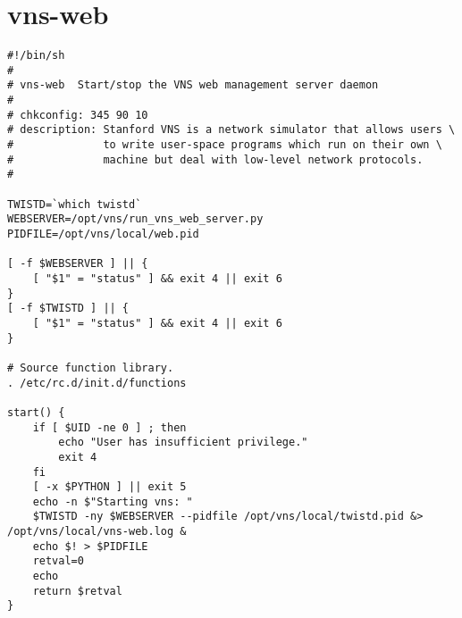 \documentclass[a4paper,12pt]{report}
\begin{document}
\section{vns-web}
\tiny
\begin{verbatim}
#!/bin/sh                                                                                                                                                                                     
#                                                                                                                                                                                             
# vns-web  Start/stop the VNS web management server daemon                                                                                                                                    
#                                                                                                                                                                                             
# chkconfig: 345 90 10                                                                                                                                                                        
# description: Stanford VNS is a network simulator that allows users \                                                                                                                        
#              to write user-space programs which run on their own \                                                                                                                          
#              machine but deal with low-level network protocols.                                                                                                                             
#                                                                                                                                                                                             

TWISTD=`which twistd`
WEBSERVER=/opt/vns/run_vns_web_server.py
PIDFILE=/opt/vns/local/web.pid

[ -f $WEBSERVER ] || {
    [ "$1" = "status" ] && exit 4 || exit 6
}
[ -f $TWISTD ] || {
    [ "$1" = "status" ] && exit 4 || exit 6
}

# Source function library.                                                                                                                                                                    
. /etc/rc.d/init.d/functions

start() {
    if [ $UID -ne 0 ] ; then
        echo "User has insufficient privilege."
        exit 4
    fi
    [ -x $PYTHON ] || exit 5
    echo -n $"Starting vns: "
    $TWISTD -ny $WEBSERVER --pidfile /opt/vns/local/twistd.pid &> /opt/vns/local/vns-web.log &
    echo $! > $PIDFILE
    retval=0
    echo
    return $retval
}


\end{verbatim}
\end{document}

